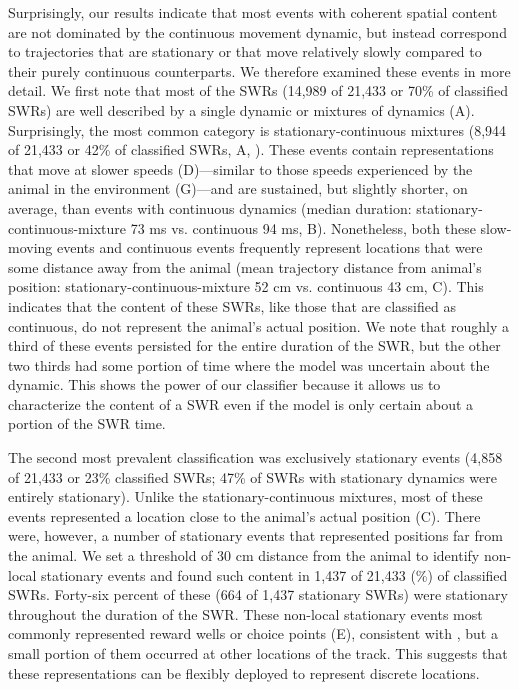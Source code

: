 \documentclass[9pt,lineno]{elife}
\begin{document}
Surprisingly, our results indicate that most events with coherent spatial content are not dominated by the continuous movement dynamic, but instead correspond to trajectories that are stationary or that move relatively slowly compared to their purely continuous counterparts. We therefore examined these events in more detail. We first note that most of the SWRs (14,989 of 21,433 or 70\% of classified SWRs) are well described by a single dynamic or mixtures of dynamics (A). Surprisingly, the most common category is stationary-continuous mixtures (8,944 of 21,433 or 42\% of classified SWRs, A, ). These events contain representations that move at slower speeds (D)---similar to those speeds experienced by the animal in the environment (G)---and are sustained, but slightly shorter, on average, than events with continuous dynamics (median duration: stationary-continuous-mixture 73 ms vs. continuous 94 ms, B). Nonetheless, both these slow-moving events and continuous events frequently represent locations that were some distance away from the animal (mean trajectory distance from animal's position: stationary-continuous-mixture 52 cm vs. continuous 43 cm, C). This indicates that the content of these SWRs, like those that are classified as continuous, do not represent the animal's actual position. We note that roughly a third of these events persisted for the entire duration of the SWR, but the other two thirds had some portion of time where the model was uncertain about the dynamic. This shows the power of our classifier because it allows us to characterize the content of a SWR even if the model is only certain about a portion of the SWR time.

The second most prevalent classification was exclusively stationary events (4,858 of 21,433 or 23\% classified SWRs; 47\% of SWRs with stationary dynamics were entirely stationary). Unlike the stationary-continuous mixtures, most of these events represented a location close to the animal's actual position (C). There were, however, a number of stationary events that represented positions far from the animal. We set a threshold of 30 cm distance from the animal to identify non-local stationary events and found such content in 1,437 of 21,433 (\%) of classified SWRs. Forty-six percent of these (664 of 1,437 stationary SWRs) were stationary throughout the duration of the SWR. These non-local stationary events most commonly represented reward wells or choice points (E), consistent with \citep{YuDistincthippocampalcorticalmemory2017}, but a small portion of them occurred at other locations of the track. This suggests that these representations can be flexibly deployed to represent discrete locations.
\end{document}
